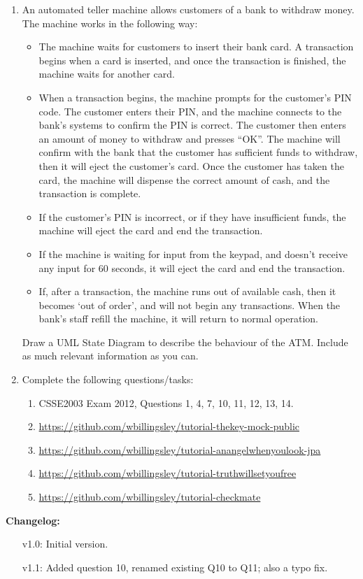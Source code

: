 \documentclass[a4paper,11pt]{article}
\begin{document}
\begin{enumerate}
\item
An automated teller machine allows customers of a bank to withdraw money.
The machine works in the following way:
\begin{itemize}
\item The machine waits for customers to insert their bank card. A transaction
begins when a card is inserted, and once the transaction is finished, the
machine waits for another card.
\item
When a transaction begins, the machine prompts for the customer's PIN code.
The customer enters their PIN, and the machine connects to the bank's systems
to confirm the PIN is correct. The customer then enters an amount of money to
withdraw and presses ``OK''.
The machine will confirm with the bank that the customer has sufficient funds
to withdraw, then it will eject the customer's card. Once the customer has
taken the card, the machine will dispense the correct amount of cash, and the
transaction is complete.
\item
If the customer's PIN is incorrect, or if they have insufficient funds, the
machine will eject the card and end the transaction.
\item
If the machine is waiting for input from the keypad, and doesn't receive any
input for 60 seconds, it will eject the card and end the transaction.
\item
If, after a transaction, the machine runs out of available cash, then it
becomes `out of order', and will not begin any transactions. When the bank's
staff refill the machine, it will return to normal operation.
\end{itemize}
Draw a UML State Diagram to describe the behaviour of the ATM. Include as much
relevant information as you can.

\item
Complete the following questions/tasks:
\begin{enumerate}
\item
CSSE2003 Exam 2012, Questions 1, 4, 7, 10, 11, 12, 13, 14.
\item
\url{https://github.com/wbillingsley/tutorial-thekey-mock-public}
\item
\url{https://github.com/wbillingsley/tutorial-anangelwhenyoulook-jpa}
\item
\url{https://github.com/wbillingsley/tutorial-truthwillsetyoufree}
\item
\url{https://github.com/wbillingsley/tutorial-checkmate}
\end{enumerate}

\end{enumerate}

\vspace{1cm}

{\bf Changelog:}
\begin{enumerate}
\item[v1.0:] Initial version.
\item[v1.1:] Added question 10, renamed existing Q10 to Q11; also a typo fix.
\end{enumerate}
\end{document}
